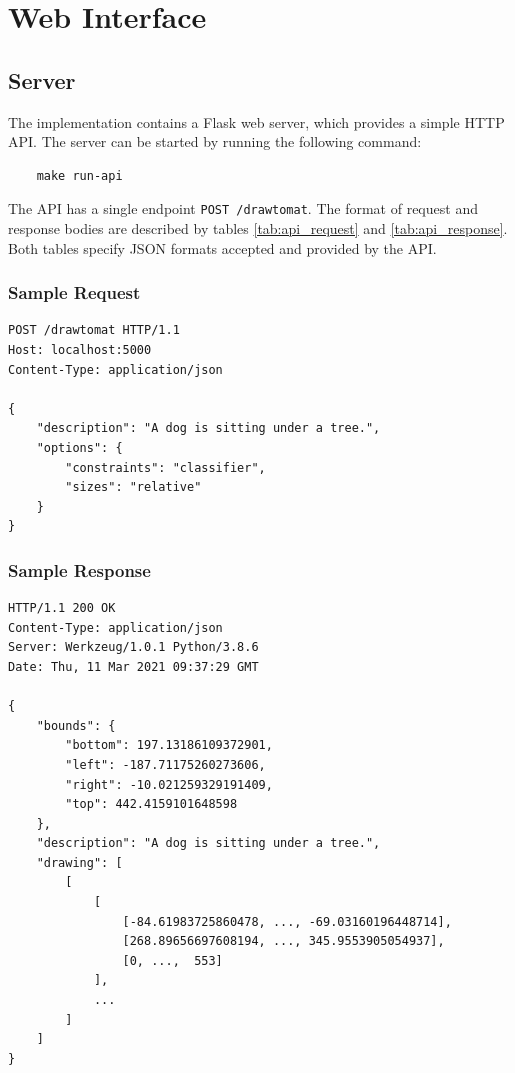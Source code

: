 \section{Web Interface}
\label{sec:web_interface}

\subsection{Server}

The implementation contains a Flask web server, which provides a simple HTTP API. The server can be started by running the following command:

\begin{verbatim}
    make run-api
\end{verbatim}

The API has a single endpoint \verb|POST /drawtomat|. The format of request and response bodies are described by tables \ref{tab:api_request} and \ref{tab:api_response}. Both tables specify JSON formats accepted and provided by the API.





\subsubsection{Sample Request}
\begin{verbatim}
POST /drawtomat HTTP/1.1
Host: localhost:5000
Content-Type: application/json

{
    "description": "A dog is sitting under a tree.",
    "options": {
        "constraints": "classifier",
        "sizes": "relative"
    }
}
\end{verbatim}

\subsubsection{Sample Response}

\begin{verbatim}
HTTP/1.1 200 OK
Content-Type: application/json
Server: Werkzeug/1.0.1 Python/3.8.6
Date: Thu, 11 Mar 2021 09:37:29 GMT

{
    "bounds": {
        "bottom": 197.13186109372901,
        "left": -187.71175260273606,
        "right": -10.021259329191409,
        "top": 442.4159101648598
    },
    "description": "A dog is sitting under a tree.",
    "drawing": [
        [
            [
                [-84.61983725860478, ..., -69.03160196448714],
                [268.89656697608194, ..., 345.9553905054937],
                [0, ...,  553]
            ],
            ...
        ]
    ]
}
\end{verbatim}

